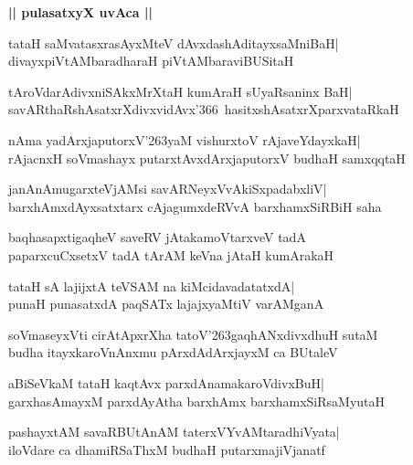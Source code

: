 \documentclass[twoside,12pt,openright]{book}
\def\S{\char'263}
\newcounter{shloka}[chapter]
\def\uvaca#1{\centerline{{\large\textbf{#1}}}}
\begin{document}
\uvaca{|| pulasatxyX uvAca ||}
\begin{shloka}%
tataH saMvatasxrasAyxMteV dAvxdashAditayxsaMniBaH|\\
divayxpiVtAMbaradharaH piVtAMbaraviBUSitaH
\end{shloka}

\begin{shloka}%
tAroVdarAdivxniSAkxMrXtaH kumAraH sUyaRsaninx BaH|\\
savARthaRshAsatxrXdivxvidAvx\char'366\ hasitxshAsatxrXparxvataRkaH
\end{shloka}

\begin{shloka}%
nAma yadArxjaputorxV\S yaM vishurxtoV rAjaveYdayxkaH|\\
rAjacnxH soVmashayx putarxtAvxdArxjaputorxV budhaH samxqqtaH
\end{shloka}

\begin{shloka}%
janAnAmugarxteVjAMsi savARNeyxVvAkiSxpadabxliV|\\
barxhAmxdAyxsatxtarx cAjagumxdeRVvA barxhamxSiRBiH saha
\end{shloka}

\begin{shloka}%
baqhasapxtigaqheV saveRV jAtakamoVtarxveV tadA\\
paparxcuCxsetxV tadA tArAM keVna jAtaH kumArakaH
\end{shloka}

\begin{shloka}%
tataH sA lajijxtA teVSAM na kiMcidavadatatxdA|\\
punaH punasatxdA paqSATx lajajxyaMtiV varAMganA
\end{shloka}

\begin{shloka}%
soVmaseyxVti cirAtApxrXha tatoV\S gaqhANxdivxdhuH sutaM\\
budha itayxkaroVnAnxmu pArxdAdArxjayxM ca BUtaleV
\end{shloka}

\begin{shloka}%
aBiSeVkaM tataH kaqtAvx parxdAnamakaroVdivxBuH|\\
garxhasAmayxM parxdAyAtha barxhAmx barxhamxSiRsaMyutaH
\end{shloka}

\begin{shloka}%
pashayxtAM savaRBUtAnAM taterxVYvAMtaradhiVyata|\\
iloVdare ca dhamiRSaThxM budhaH putarxmajiVjanatf
\end{shloka}
\end{document}
